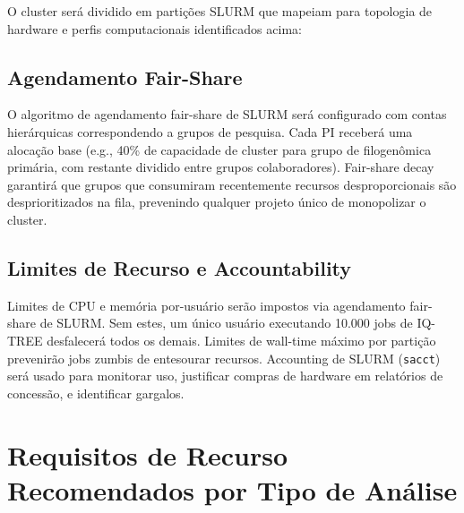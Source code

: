 O cluster será dividido em partições SLURM que mapeiam para topologia de hardware e perfis computacionais identificados acima:

\begin{table}[htbp]
\centering
\caption{Partições SLURM Recomendadas}
\end{table}

\subsection{Agendamento Fair-Share}

O algoritmo de agendamento fair-share de SLURM será configurado com contas hierárquicas correspondendo a grupos de pesquisa. Cada PI receberá uma alocação base (e.g., 40\% de capacidade de cluster para grupo de filogenômica primária, com restante dividido entre grupos colaboradores). Fair-share decay garantirá que grupos que consumiram recentemente recursos desproporcionais são desprioritizados na fila, prevenindo qualquer projeto único de monopolizar o cluster.

\subsection{Limites de Recurso e Accountability}

Limites de CPU e memória por-usuário serão impostos via agendamento fair-share de SLURM. Sem estes, um único usuário executando 10.000 jobs de IQ-TREE desfalecerá todos os demais. Limites de wall-time máximo por partição prevenirão jobs zumbis de entesourar recursos. Accounting de SLURM (\texttt{sacct}) será usado para monitorar uso, justificar compras de hardware em relatórios de concessão, e identificar gargalos.

\section{Requisitos de Recurso Recomendados por Tipo de Análise}

